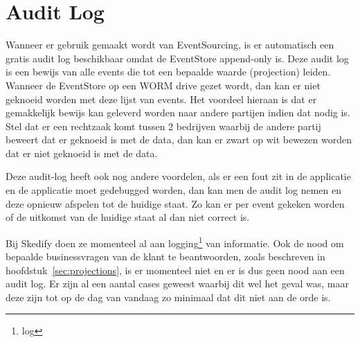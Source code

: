 
\section{Audit Log}
\label{sec:audit-log}

Wanneer er gebruik gemaakt wordt van EventSourcing, is er automatisch een gratis audit log beschikbaar omdat de EventStore append-only is. Deze audit log is een bewijs van alle events die tot een bepaalde waarde (projection) leiden. Wanneer de EventStore op een \gls{WORM} drive gezet wordt, dan kan er niet geknoeid worden met deze lijst van events. Het voordeel hieraan is dat er gemakkelijk bewijs kan geleverd worden naar andere partijen indien dat nodig is. Stel dat er een rechtzaak komt tussen 2 bedrijven waarbij de andere partij beweert dat er geknoeid is met de data, dan kan er zwart op wit bewezen worden dat er niet geknoeid is met de data.

Deze audit-log heeft ook nog andere voordelen, als er een fout zit in de applicatie en de applicatie moet gedebugged worden, dan kan men de audit log nemen en deze opnieuw afspelen tot de huidige staat. Zo kan er per event gekeken worden of de uitkomst van de huidige staat al dan niet correct is.

Bij Skedify doen ze momenteel al aan logging\footnote{\glsdesc{log}} van informatie. Ook de nood om bepaalde businessvragen van de klant te beantwoorden, zoals beschreven in hoofdstuk~\ref{sec:projections}, is er momenteel niet en er is dus geen nood aan een audit log. Er zijn al een aantal cases geweest waarbij dit wel het geval was, maar deze zijn tot op de dag van vandaag zo minimaal dat dit niet aan de orde is.